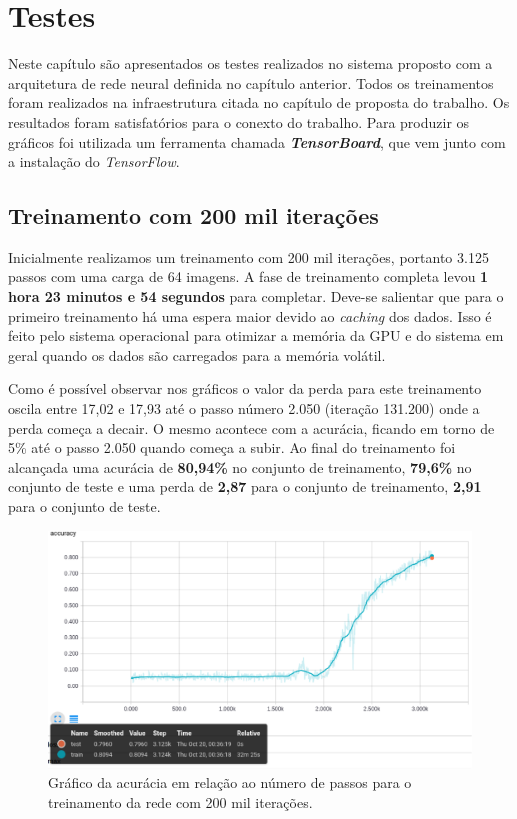 \chapter{ Testes }

Neste capítulo são apresentados os testes realizados no sistema
proposto com a arquitetura de rede neural definida no capítulo
anterior. Todos os treinamentos foram realizados na infraestrutura
citada no capítulo de proposta do trabalho. Os resultados foram
satisfatórios para o conexto do trabalho. Para produzir os gráficos
foi utilizada um ferramenta chamada {\bf \emph{TensorBoard}}, que vem
junto com a instalação do \textit{TensorFlow}.

\section{Treinamento com 200 mil iterações}

Inicialmente realizamos um treinamento com 200 mil iterações, portanto
3.125 passos com uma carga de 64 imagens. A fase de treinamento
completa levou {\bf 1 hora 23 minutos e 54 segundos} para
completar. Deve-se salientar que para o primeiro treinamento há uma
espera maior devido ao \textit{caching} dos dados. Isso é feito pelo
sistema operacional para otimizar a memória da GPU e do sistema em
geral quando os dados são carregados para a memória volátil. 

Como é possível observar nos gráficos o valor da perda para este
treinamento oscila entre 17,02 e 17,93 até o passo número 2.050
(iteração 131.200) onde a perda começa a decair. O mesmo acontece com
a acurácia, ficando em torno de 5\% até o passo 2.050 quando começa a
subir. Ao final do treinamento foi alcançada uma acurácia de {\bf
  80,94\%} no conjunto de treinamento, {\bf 79,6\%} no conjunto de
teste e uma perda de {\bf 2,87} para o conjunto de treinamento, {\bf
  2,91} para o conjunto de teste.

\begin{figure}[H]
\centering
\includegraphics[scale=0.4]{imagens/accuracy_200k}
\caption{Gráfico da acurácia em relação ao número de passos para o
  treinamento da rede com 200 mil iterações.}
\label{fig:accuracy_200k}
\end{figure}

